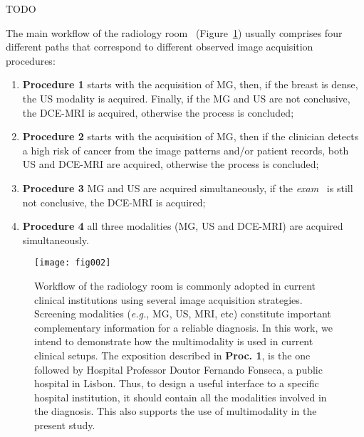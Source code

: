 TODO

The main workflow of the radiology room~\cite{wagner2015analysis} (Figure~\ref{fig:fig002}) usually comprises four different paths that correspond to different observed image acquisition procedures:

\begin{enumerate}
\item \textbf{Procedure 1} starts with the acquisition of MG, then, if the breast is dense, the US modality is acquired. Finally, if the MG and US are not conclusive, the DCE-MRI is acquired, otherwise the process is concluded;
\item \textbf{Procedure 2} starts with the acquisition of MG, then if the clinician detects a high risk of cancer from the image patterns and/or patient records, both US and DCE-MRI are acquired, otherwise the process is concluded;
\item \textbf{Procedure 3} MG and US are acquired simultaneously, if the {\it exam}~\cite{wagner2015analysis} is still not conclusive, the DCE-MRI is acquired;
\item \textbf{Procedure 4} all three modalities (MG, US and DCE-MRI) are acquired simultaneously.
\end{enumerate}

\clearpage

\begin{figure}
\centering
\texttt{[image: fig002]}
\caption{Workflow of the radiology room is commonly adopted in current clinical institutions using several image acquisition strategies. Screening modalities ({\it e.g.}, MG, US, MRI, etc) constitute important complementary information for a reliable diagnosis. In this work, we intend to demonstrate how the multimodality is used in current clinical setups. The exposition described in {\bf Proc. 1}, is the one followed by Hospital Professor Doutor Fernando Fonseca, a public hospital in Lisbon. Thus, to design a useful interface to a specific hospital institution, it should contain all the modalities involved in the diagnosis. This also supports the use of multimodality in the present study.}
\label{fig:fig002}
\end{figure}

